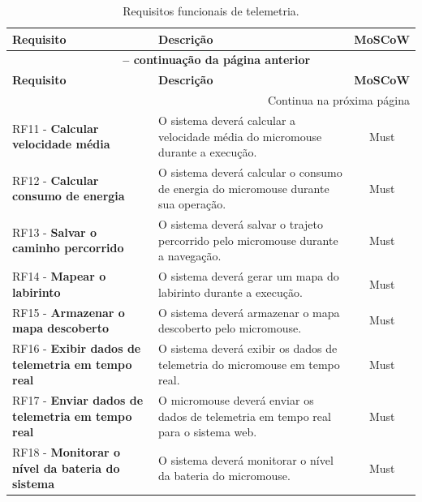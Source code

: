     \begin{center}
    \begin{longtable}{|p{5.5cm}|p{8cm}|c|}
    \caption{Requisitos funcionais de telemetria.} \label{tab:telemetria} \\
    \hline
    \textbf{Requisito} & \textbf{Descrição} & \textbf{MoSCoW} \\ \hline
    \endfirsthead
    \multicolumn{3}{c}{{\bfseries \tablename\ \thetable{} -- continuação da página anterior}} \\
    \hline
    \textbf{Requisito} & \textbf{Descrição} & \textbf{MoSCoW} \\ \hline
    \endhead
    \hline \multicolumn{3}{r}{{Continua na próxima página}} \\ \endfoot
    \hline \endlastfoot

    RF11 - \textbf{Calcular velocidade média} & O sistema deverá calcular a velocidade média do micromouse durante a execução. & Must \\ \hline

    RF12 - \textbf{Calcular consumo de energia} & O sistema deverá calcular o consumo de energia do micromouse durante sua operação. & Must \\ \hline

    RF13 - \textbf{Salvar o caminho percorrido} & O sistema deverá salvar o trajeto percorrido pelo micromouse durante a navegação. & Must \\ \hline

    RF14 - \textbf{Mapear o labirinto} & O sistema deverá gerar um mapa do labirinto durante a execução. & Must \\ \hline

    RF15 - \textbf{Armazenar o mapa descoberto} & O sistema deverá armazenar o mapa descoberto pelo micromouse. & Must \\ \hline

    RF16 - \textbf{Exibir dados de telemetria em tempo real} & O sistema deverá exibir os dados de telemetria do micromouse em tempo real. & Must \\ \hline

    RF17 - \textbf{Enviar dados de telemetria em tempo real} & O micromouse deverá enviar os dados de telemetria em tempo real para o sistema web. & Must \\ \hline

    RF18 - \textbf{Monitorar o nível da bateria do sistema} & O sistema deverá monitorar o nível da bateria do micromouse. & Must \\ \hline


\end{longtable}
\end{center}
